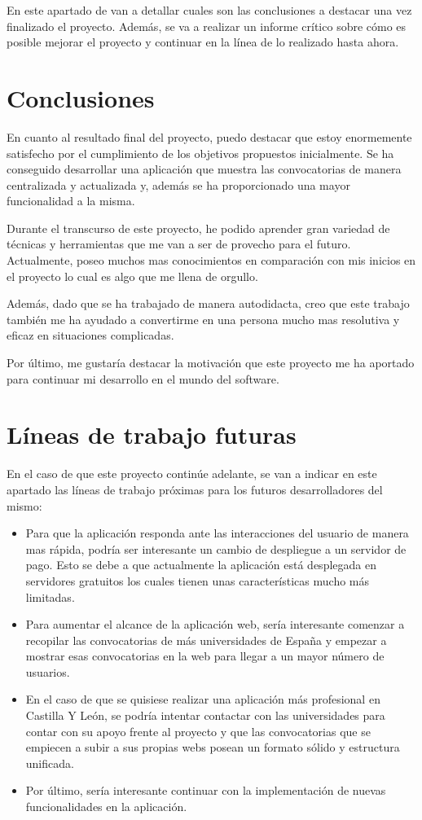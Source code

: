 
En este apartado de van a detallar cuales son las conclusiones a destacar una vez finalizado el proyecto. Además, se va a realizar un informe crítico sobre cómo es posible mejorar el proyecto y continuar en la línea de lo realizado hasta ahora.

\section{Conclusiones}
En cuanto al resultado final del proyecto, puedo destacar que estoy enormemente satisfecho por el cumplimiento de los objetivos propuestos inicialmente. Se ha conseguido desarrollar una aplicación que muestra las convocatorias de manera centralizada y actualizada y, además se ha proporcionado una mayor funcionalidad a la misma.

Durante el transcurso de este proyecto, he podido aprender gran variedad de técnicas y herramientas que me van a ser de provecho para el futuro. Actualmente, poseo muchos mas conocimientos en comparación con mis inicios en el proyecto lo cual es algo que me llena de orgullo.

Además, dado que se ha trabajado de manera autodidacta, creo que este trabajo también me ha ayudado a convertirme en una persona mucho mas resolutiva y eficaz en situaciones complicadas.

Por último, me gustaría destacar la motivación que este proyecto me ha aportado para continuar mi desarrollo en el mundo del software.


\section{Líneas de trabajo futuras}
En el caso de que este proyecto continúe adelante, se van a indicar en este apartado las líneas de trabajo próximas para los futuros desarrolladores del mismo:

\begin{itemize}
    \item Para que la aplicación responda ante las interacciones del usuario de manera mas rápida, podría ser interesante un cambio de despliegue a un servidor de pago. Esto se debe a que actualmente la aplicación está desplegada en servidores gratuitos los cuales tienen unas características mucho más limitadas.
    \item Para aumentar el alcance de la aplicación web, sería interesante comenzar a recopilar las convocatorias de más universidades de España y empezar a mostrar esas convocatorias en la web para llegar a un mayor número de usuarios.
    \item En el caso de que se quisiese realizar una aplicación más profesional en Castilla Y León, se podría intentar contactar con las universidades para contar con su apoyo frente al proyecto y que las convocatorias que se empiecen a subir a sus propias webs posean un formato sólido y estructura unificada.
    \item Por último, sería interesante continuar con la implementación de nuevas funcionalidades en la aplicación.
\end{itemize}